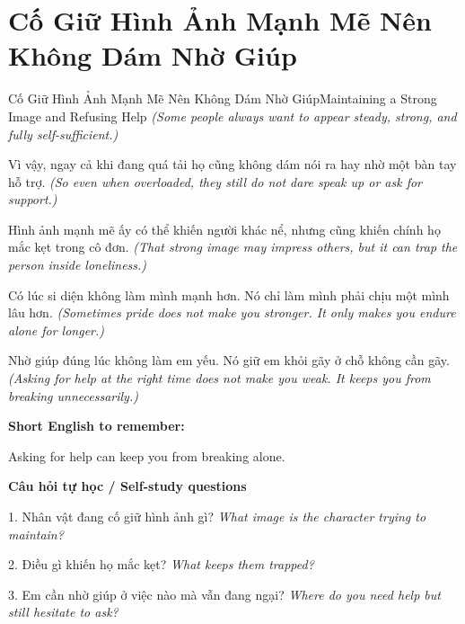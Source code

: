 \section{Cố Giữ Hình Ảnh Mạnh Mẽ Nên Không Dám Nhờ Giúp}
\begin{truyen}{Cố Giữ Hình Ảnh Mạnh Mẽ Nên Không Dám Nhờ Giúp}{Maintaining a Strong Image and Refusing Help}
\textit{(Some people always want to appear steady, strong, and fully self-sufficient.)}

Vì vậy, ngay cả khi đang quá tải họ cũng không dám nói ra hay nhờ một bàn tay hỗ trợ.
\textit{(So even when overloaded, they still do not dare speak up or ask for support.)}

Hình ảnh mạnh mẽ ấy có thể khiến người khác nể, nhưng cũng khiến chính họ mắc kẹt trong cô đơn.
\textit{(That strong image may impress others, but it can trap the person inside loneliness.)}

Có lúc si diện không làm mình mạnh hơn. Nó chỉ làm mình phải chịu một mình lâu hơn.
\textit{(Sometimes pride does not make you stronger. It only makes you endure alone for longer.)}

\end{truyen}

\begin{baihoc}
Nhờ giúp đúng lúc không làm em yếu. Nó giữ em khỏi gãy ở chỗ không cần gãy.
\textit{(Asking for help at the right time does not make you weak. It keeps you from breaking unnecessarily.)}
\end{baihoc}

\begin{ghinhoanh}
\textbf{Short English to remember:}

Asking for help can keep you from breaking alone.

\end{ghinhoanh}

\begin{tuhocnhanh}
\textbf{Câu hỏi tự học / Self-study questions}

1. Nhân vật đang cố giữ hình ảnh gì? \textit{What image is the character trying to maintain?}

2. Điều gì khiến họ mắc kẹt? \textit{What keeps them trapped?}

3. Em cần nhờ giúp ở việc nào mà vẫn đang ngại? \textit{Where do you need help but still hesitate to ask?}
\end{tuhocnhanh}
\ngancach

